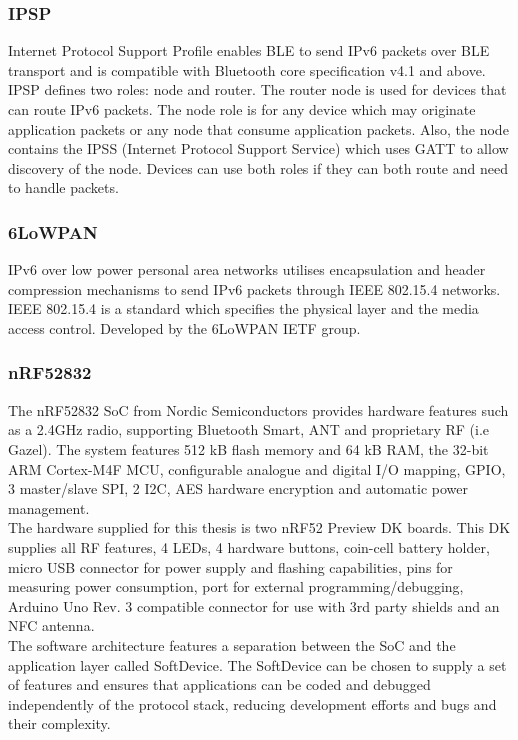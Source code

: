 \documentclass{article}
\begin{document}
\subsubsection{IPSP}
Internet Protocol Support Profile enables BLE to send IPv6 packets over BLE transport and is compatible with Bluetooth core specification v4.1 and above.\cite{bleipsp} 
IPSP defines two roles: node and router. The router node is used for devices that can route IPv6 packets. The node role is for any device which may originate application packets or any node that consume application packets. Also, the node contains the IPSS (Internet Protocol Support Service) which uses GATT to allow discovery of the node. Devices can use both roles if they can both route and need to handle packets.

\subsubsection{6LoWPAN}
IPv6 over low power personal area networks utilises encapsulation and header compression mechanisms to send IPv6 packets through IEEE 802.15.4 networks. IEEE 802.15.4 is a standard which specifies the physical layer and the media access control. Developed by the 6LoWPAN IETF group.

\subsubsection{nRF52832}
The nRF52832 SoC from Nordic Semiconductors provides hardware features such as a 2.4GHz radio, supporting Bluetooth Smart, ANT and proprietary RF (i.e Gazel).
The system features 512 kB flash memory and 64 kB RAM, the 32-bit ARM Cortex-M4F MCU, configurable analogue and digital I/O mapping, GPIO, 3 master/slave SPI, 2 I2C, AES hardware encryption and automatic power management.\cite{nrf52832}\\
The hardware supplied for this thesis is two nRF52 Preview DK boards. This DK supplies all RF features, 4 LEDs, 4 hardware buttons, coin-cell battery holder, micro USB connector for power supply and flashing capabilities, pins for measuring power consumption, port for external programming/debugging,  Arduino Uno Rev. 3 compatible connector for use with 3rd party shields and an NFC antenna.\\

The software architecture features a separation between the SoC and the application layer called SoftDevice. The SoftDevice can be chosen to supply a set of features and ensures that applications can be coded and debugged independently of the protocol stack, reducing development efforts and bugs and their complexity.\\
\end{document}
